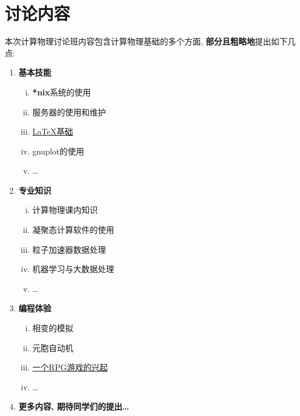 \documentclass[10pt,a4paper, twocolumn]{article}
\begin{document}
  \section{讨论内容}
  本次计算物理讨论班内容包含计算物理基础的多个方面, \textbf{部分且粗略地}提出如下几点:
    \begin{enumerate}
      \item \textbf{基本技能}
      \begin{enumerate}[i)]
        \item \textbf{*nix}系统的使用
        \item 服务器的使用和维护
        \item \href{https://github.com/louisstuart96/lshort-new-zh-cn/%
                    blob/master/lshort-zh-cn.pdf}
                   {{\LaTeX}基础}
        \item gnuplot的使用
        \item \ldots
      \end{enumerate}

      \item \textbf{专业知识}
      \begin{enumerate}[i)]
        \item 计算物理课内知识
        \item 凝聚态计算软件的使用
        \item 粒子加速器数据处理
        \item 机器学习与大数据处理
        \item \ldots
      \end{enumerate}

      \item \textbf{编程体验}
      \begin{enumerate}[i)]
        \item 相变的模拟
        \item 元胞自动机
        \item \href{https://github.com/JLUComPhy/JLU_Computational%
            _Physics/tree/master/Python/2nd_Lesson}{一个RPG游戏的兴起}
        \item \ldots
      \end{enumerate}

      \item \textbf{更多内容, 期待同学们的提出\ldots}
    \end{enumerate}
\end{document}
